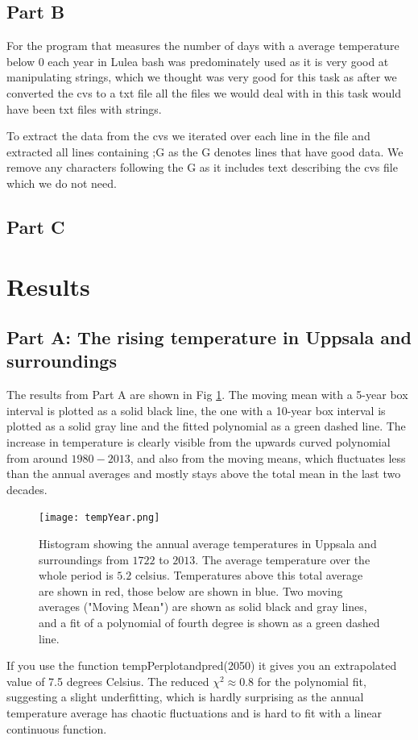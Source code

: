 \documentclass[a4paper]{article}
\begin{document}
\subsection{Part B}
For the program that measures the number of days with a average temperature below 0 each year in Lulea bash was predominately used as it is very good at manipulating strings,  which we thought was very good for this task as after we converted the cvs to a txt file all the files we would deal with in this task would have been txt files with strings.

To extract the data from the cvs we iterated over each line in the file and extracted all lines containing ;G as the G denotes lines that have good data. We remove any characters following the G as it includes text describing the cvs file which we do not need.

\subsection{Part C}




\section{Results}
\subsection{Part A: The rising temperature in Uppsala and surroundings}
The results from Part A are shown in Fig \ref{fig:year}. The moving mean with a 5-year box interval is plotted as a solid black line, the one with a 10-year box interval is plotted as a solid gray line and the fitted polynomial as a green dashed line. The increase in temperature is clearly visible from the upwards curved polynomial from around $1980-2013$, and also from the moving means, which fluctuates less than the annual averages and mostly stays above the total mean in the last two decades.
\begin{figure}[H]
   \centering
  \texttt{[image: tempYear.png]}
    \caption{Histogram showing the annual average temperatures in Uppsala and surroundings from $1722$ to $2013$. The average temperature over the whole period is $5.2$ celsius. Temperatures above this total average are shown in red, those below are shown in blue. Two moving averages ("Moving Mean") are shown as solid black and gray lines, and a fit of a polynomial of fourth degree is shown as a green dashed line.}
   \label{fig:year}
\end{figure}
If you use the function tempPerplotandpred(2050) it gives you an extrapolated value of 7.5 degrees Celsius.
The reduced $\chi^2 \approx 0.8$ for the polynomial fit, suggesting a slight underfitting, which is hardly surprising as the annual temperature average has chaotic fluctuations and is hard to fit with a linear continuous function.
\end{document}

